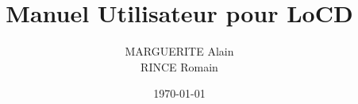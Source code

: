 \documentclass[12pt,a4paper,utf8x,titlepage]{report}
\title{Manuel Utilisateur pour LoCD}
\author{MARGUERITE Alain\\ RINCE Romain}
\date{\today}
\begin{document}
\maketitle




\clearpage

\tableofcontents
\clearpage

%








\printglossary

\listoffigures
\printindex



\appendix
%


\end{document}
